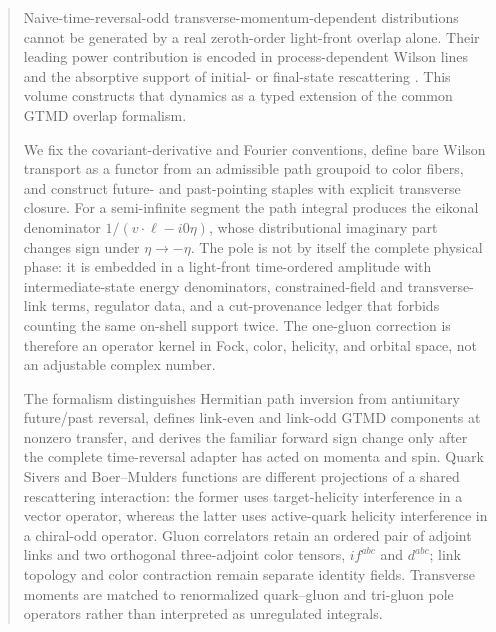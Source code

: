 \documentclass[11pt]{article}
\begin{document}
\begin{abstract}
Naive-time-reversal-odd transverse-momentum-dependent distributions cannot be
generated by a real zeroth-order light-front overlap alone.  Their leading
power contribution is encoded in process-dependent Wilson lines and the
absorptive support of initial- or final-state rescattering
\cite{BrodskyHwangSchmidt2002,Collins2002,BelitskyJiYuan2003}.  This volume
constructs that dynamics as a typed extension of the common GTMD overlap
formalism.

We fix the covariant-derivative and Fourier conventions, define bare Wilson
transport as a functor from an admissible path groupoid to color fibers, and
construct future- and past-pointing staples with explicit transverse closure.
For a semi-infinite segment the path integral produces the eikonal denominator
\(1/(v\!\cdot\!\ell-i0\eta)\), whose distributional imaginary part changes
sign under \(\eta\to-\eta\).  The pole is not by itself the complete physical
phase: it is embedded in a light-front time-ordered amplitude with
intermediate-state energy denominators, constrained-field and transverse-link
terms, regulator data, and a cut-provenance ledger that forbids counting the
same on-shell support twice.  The one-gluon correction is therefore an
operator kernel in Fock, color, helicity, and orbital space, not an adjustable
complex number.

The formalism distinguishes Hermitian path inversion from antiunitary
future/past reversal, defines link-even and link-odd GTMD components at
nonzero transfer, and derives the familiar forward sign change only after the
complete time-reversal adapter has acted on momenta and spin.  Quark Sivers
and Boer--Mulders functions are different projections of a shared
rescattering interaction: the former uses target-helicity interference in a
vector operator, whereas the latter uses active-quark helicity interference
in a chiral-odd operator.  Gluon correlators retain an ordered pair of
adjoint links and two orthogonal three-adjoint color tensors,
\(if^{abc}\) and \(d^{abc}\); link topology and color contraction remain
separate identity fields.  Transverse moments are matched to renormalized
quark--gluon and tri-gluon pole operators rather than interpreted as
unregulated integrals.


\end{abstract}
\end{document}
